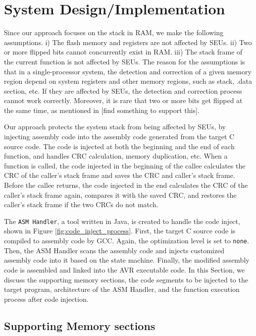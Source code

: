 \section{System Design/Implementation}\label{sec:design}

Since our approach focuses on the stack in RAM, we make the following assumptions. i) The flash memory and registers are not affected by SEUs. ii) Two or more flipped bits cannot concurrently exist in RAM. iii) The stack frame of the current function is not affected by SEUs. The reason for the assumptions is that in a single-processor system, the detection and correction of a given memory region depend on system registers and other memory regions, such as stack, .data section, etc. If they are affected by SEUs, the detection and correction process cannot work correctly. Moreover, it is rare that two or more bits get flipped at the same time, as mentioned in [find something to support this].

Our approach protects the system stack from being affected by SEUs, by injecting assembly code into the assembly code generated from the target C source code. The code is injected at both the beginning and the end of each function, and handles CRC calculation, memory duplication, etc. When a function is called, the code injected in the beginning of the callee calculates the CRC of the caller's stack frame and saves the CRC and caller's stack frame. Before the callee returns, the code injected in the end calculates the CRC of the caller's stack frame again, compares it with the saved CRC, and restores the caller's stack frame if the two CRCs do not match.

The \texttt{ASM Handler}, a tool written in Java, is created to handle the code inject, shown in Figure \ref{fig:code_inject_process}. First, the target C source code is compiled to assembly code by GCC. Again, the optimization level is set to \texttt{none}. Then, the ASM Handler scans the assembly code and injects customized assembly code into it based on the state machine. Finally, the modified assembly code is assembled and linked into the AVR executable code. In this Section, we discuss the supporting memory sections, the code segments to be injected to the target program, architecture of the ASM Handler, and the function execution process after code injection.

\subsection{Supporting Memory sections}\label{sec:memory_sections}

